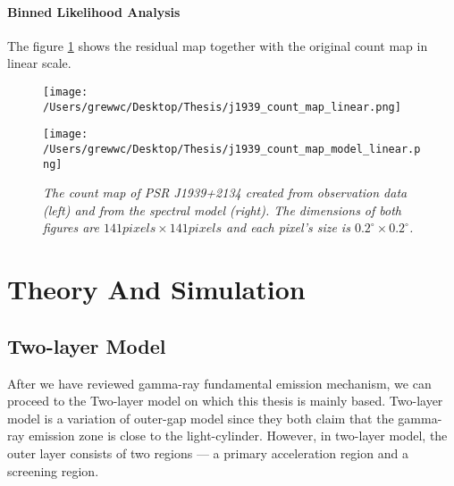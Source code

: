 \documentclass[12pt]{report}
\newcommand{\mycaption}[1]{\caption{\textit{\footnotesize #1}}}
\begin{document}
      \subsubsection{Binned Likelihood Analysis}
          The figure \ref{fig: j1939_count_map_diff} shows the residual map together with the 
          original count map in linear scale.
          \begin{figure}[!ht]
            \begin{center}
            \begin{minipage}{0.45\textwidth}
              \begin{center} 
                \texttt{[image: /Users/grewwc/Desktop/Thesis/j1939\_count\_map\_linear.png]}
              \end{center}
            \end{minipage}
            \begin{minipage}{0.45\textwidth}
              \begin{center}
                \texttt{[image: /Users/grewwc/Desktop/Thesis/j1939\_count\_map\_model\_linear.png]}
              \end{center}
            \end{minipage}
          \end{center}
          \centering

          \begin{minipage}{\textwidth}
            \mycaption{The count map of PSR J1939+2134 created from observation 
            data (\textsf{left}) and from the spectral model (\textsf{right}). The dimensions
            of both figures are $141 pixels \times 141 pixels$ and each pixel's size is
            $0.2^{\circ}\times0.2^{\circ}$.}
            \label{fig: j1939_count_map_diff}
          \end{minipage}
        \end{figure}
        \vspace{1cm}


    \chapter{Theory And Simulation}
      \section{Two-layer Model}
      After we have reviewed gamma-ray fundamental emission mechanism, we can proceed to
      the Two-layer model on which this thesis is mainly based. Two-layer model is a 
      variation of outer-gap model since they both claim that the gamma-ray emission zone
      is close to the light-cylinder. However, in two-layer model, the outer layer 
      consists of two regions --- a primary acceleration region and a screening region. 
\end{document}
